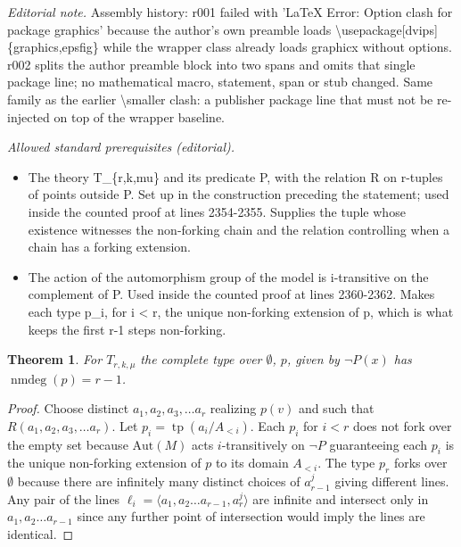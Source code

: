 \documentclass[10pt,a4paper]{amsart}
\def\nmdeg{\mathop{\rm nmdeg}}
\def\nmdeg{\operatorname{nmdeg}}
\DeclareMathOperator{\tp}{tp}
\newtheorem{theorem}{Theorem}[section]
\theoremstyle{definition}
\theoremstyle{remark}
\numberwithin{equation}{section}
\begin{document}
\noindent\textit{Editorial note.} Assembly history: r001 failed with 'LaTeX Error: Option clash for package graphics' because the author's own preamble loads \textbackslash{}usepackage[dvips]\{graphics,epsfig\} while the wrapper class already loads graphicx without options. r002 splits the author preamble block into two spans and omits that single package line; no mathematical macro, statement, span or stub changed. Same family as the earlier \textbackslash{}smaller clash: a publisher package line that must not be re-injected on top of the wrapper baseline.\par\medskip
\noindent\textit{Allowed standard prerequisites (editorial).}\begin{itemize}
\item The theory T\_\{r,k,mu\} and its predicate P, with the relation R on r-tuples of points outside P. Set up in the construction preceding the statement; used inside the counted proof at lines 2354-2355. Supplies the tuple whose existence witnesses the non-forking chain and the relation controlling when a chain has a forking extension.
\item The action of the automorphism group of the model is i-transitive on the complement of P. Used inside the counted proof at lines 2360-2362. Makes each type p\_i, for i < r, the unique non-forking extension of p, which is what keeps the first r-1 steps non-forking.
\end{itemize}\medskip
\begin{theorem}\label{2,2} For $T_{r,k,\mu}$ the  complete type over $\emptyset$, $p$,
  given by $\neg P(x)$ has $\nmdeg(p) =r-1$.
 \end{theorem}

\begin{proof} Choose distinct $a_1, a_2, a_3,\ldots a_r$ realizing $p(v)$ and such that $R(a_1, a_2,
a_3, \ldots a_r)$.
Let $p_i = \tp(a_i/A_{<i})$. Each $p_i$ for $i < r$ does not fork over the
empty set because  $\mathrm{Aut}(M)$ acts $i$-transitively on $\neg P$ guaranteeing
each $p_i$ is the unique non-forking extension of $p$ to its domain $A_{<i}$.
The type $p_r$ forks over $\emptyset$ because there are infinitely many
distinct choices of $a_{r-1}^j$ giving different lines. Any pair of the lines
$\ell_i = \langle a_1, a_2 \dots a_{r-1}, a^j_r \rangle$ are infinite and intersect only in
$a_1, a_2 \dots a_{r-1}$ since any further point of intersection would imply
the lines are identical.
%
\end{proof}
\end{document}
